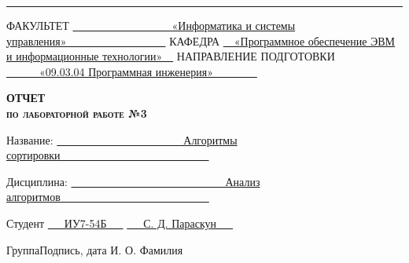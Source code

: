 \begin{titlepage}
	\noindent\rule{18cm}{1.5pt}
	
	\vspace{8mm}
	
	\noindent\textnormal{ФАКУЛЬТЕТ}\hspace{5mm} \underline{\textnormal{~~~~~~~~~~~~~~~~~~«Информатика и системы управления»~~~~~~~~~~~~~~~~~~}} \newline\newline
	\textnormal{КАФЕДРА}\hspace{5mm} \underline{\textnormal{~~«Программное обеспечение ЭВМ и информационные технологии»~~}}
	\newline\newline
	\textnormal{НАПРАВЛЕНИЕ ПОДГОТОВКИ}\hspace{5mm} \underline{\textnormal{~~~~~~«09.03.04 Программная инженерия»~~~~~~~~}}
	
	\vspace{2.5cm}
	
	\begin{center}
		\Large\textbf{\textsc{ОТЧЕТ}}\\
		\Large\textbf{\textsc{по лабораторной работе №3}}\\
	\end{center}
	
	\vspace{1cm}
	
	\noindent\textnormal{Название:} \hspace{15mm} \underline{\textnormal{~~~~~~~~~~~~~~~~~~~~~~~Алгоритмы сортировки~~~~~~~~~~~~~~~~~~~~~~~~~~~}}\noindent
	
	\vspace{1.3cm}
	
	\noindent\textnormal{Дисциплина:} \hspace{10mm} \underline{\textnormal{~~~~~~~~~~~~~~~~~~~~~~~~~~~~Анализ алгоритмов~~~~~~~~~~~~~~~~~~~~~~~~~~~}}\noindent
	
	\vspace{2cm}
	
	\noindent\textnormal{Студент} \hspace{17mm}
	\underline{\textnormal{{~~~ИУ7-54Б~~~}}}
	\hspace{20mm}
	\underline{\textnormal{\hphantom{~~~~~~~~~~~~~~~~~~~~~~~~~~~}}} \hspace{15mm}
	\underline{\textnormal{~~~С. Д. Параскун~~~}}
	
	\vspace{2mm}
	\noindent\textnormal{\hphantom{Студент}} \hspace{23mm}\noindent
	\fontsize{8pt}{8pt}
	\textnormal{Группа}\hspace{40mm}\textnormal{Подпись, дата} \hspace{30mm}\noindent\textnormal{И. О. Фамилия}
	

\end{titlepage}

